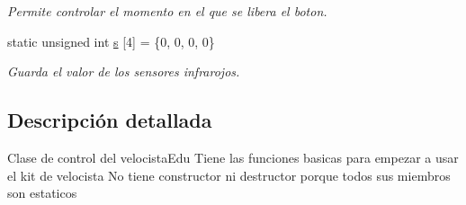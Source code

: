 \begin{DoxyCompactItemize}
\begin{DoxyCompactList}\small\item\em Permite controlar el momento en el que se libera el boton. \end{DoxyCompactList}\item 
\hypertarget{classVelocistaEdu_ae3107ce76e04c78e7294bef7c14c544a}{static unsigned int \hyperlink{classVelocistaEdu_ae3107ce76e04c78e7294bef7c14c544a}{s} \mbox{[}4\mbox{]} = \{0, 0, 0, 0\}}\label{classVelocistaEdu_ae3107ce76e04c78e7294bef7c14c544a}

\begin{DoxyCompactList}\small\item\em Guarda el valor de los sensores infrarojos. \end{DoxyCompactList}\end{DoxyCompactItemize}


\subsection{Descripción detallada}
Clase de control del velocista\-Edu Tiene las funciones basicas para empezar a usar el kit de velocista No tiene constructor ni destructor porque todos sus miembros son estaticos 

